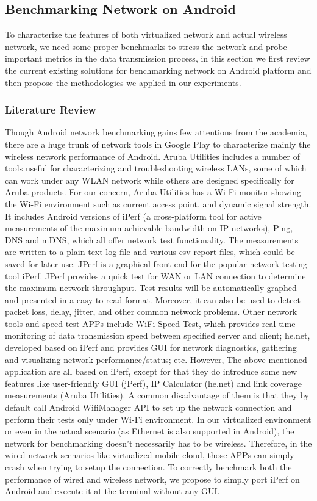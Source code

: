 \documentclass[journal,comsoc]{IEEEtran}
\begin{document}
\subsection{Benchmarking Network on Android}
To characterize the features of both virtualized network and actual wireless network, we need some proper benchmarks to stress the network and probe important metrics in the data transmission process, in this section we first review the current existing solutions for benchmarking network on Android platform and then propose the methodologies we applied in our experiments.
\subsubsection{Literature Review}
Though Android network benchmarking gains few attentions from the academia, there are a huge trunk of network tools in Google Play to characterize mainly the wireless network performance of Android. Aruba Utilities\cite{aruba_utility} includes a number of tools useful for characterizing and troubleshooting wireless LANs, some of which can work under any WLAN network while others are designed specifically for Aruba products. For our concern, Aruba Utilities has a Wi-Fi monitor
showing the Wi-Fi environment such as current access point, and dynamic signal
strength. It includes Android versions of iPerf\cite{tirumala2005iperf} (a cross-platform tool for active measurements of the maximum achievable bandwidth on IP networks), Ping, DNS and mDNS, which all offer
network test functionality. The measurements are written to a plain-text log file and
various csv report files, which could be saved for later use. JPerf\cite{brethour2003jperf} is a graphical front end for the popular network testing tool iPerf. JPerf provides a quick test for WAN or LAN connection to determine the maximum network throughput. Test results will be automatically graphed and presented in a easy-to-read format. Moreover, it can also be used to detect packet loss, delay, jitter, and other common network problems. Other network tools and speed test APPs include WiFi Speed Test\cite{wifi_test}, which provides real-time monitoring of data transmission speed between specified server and client; he.net\cite{iperf}, developed based on iPerf and provides GUI for network diagnostics, gathering and visualizing network performance/status; etc. However, The above mentioned application are all based on iPerf, except for that they do introduce some new
features like user-friendly GUI (jPerf), IP Calculator (he.net) and
link coverage measurements (Aruba Utilities). A common disadvantage of them is that they by default call Android WifiManager API to set up the network connection and perform  their
tests only under Wi-Fi environment. In our virtualized environment or even in the actual scenario (as Ethernet is also supported in Android), the network for benchmarking doesn't necessarily has to be wireless. Therefore, in the wired network scenarios like virtualized mobile cloud, those APPs can simply crash when trying to setup the connection. To correctly benchmark both the performance of wired and wireless network, we propose to simply port iPerf on Android and execute it at the terminal without any GUI.
\end{document}
